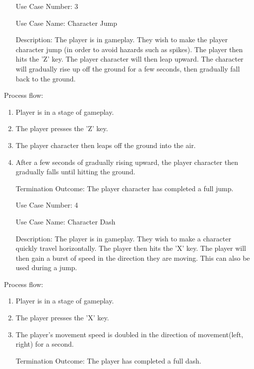 \documentclass[10pt,conference,onecolumn,compsoc]{IEEEtran}
\begin{document}
\begin{itemize}
\item[Use Case Number:] 3
\item[Use Case Name:] Character Jump
\item[Description:] The player is in gameplay. They wish to make the player character jump (in order to avoid hazards such as spikes). The player then hits the 'Z' key. The player character will then leap upward. The character will gradually rise up off the ground for a few seconds, then gradually fall back to the ground.
\end{itemize}

Process flow:

\begin{enumerate}
\item Player is in a stage of gameplay.
\item The player presses the 'Z' key.
\item The player character then leaps off the ground into the air.
\item After a few seconds of gradually rising upward, the player character then gradually falls until hitting the ground.
\item[Termination Outcome:] The player character has completed a full jump.
\end{enumerate}

\begin{itemize}
\item[Use Case Number:] 4
\item[Use Case Name:] Character Dash
\item[Description:] The player is in gameplay. They wish to make a character quickly travel horizontally. The player then hits the 'X' key. The player will then gain a burst of speed in the direction they are moving. This can also be used during a jump.
\end{itemize}

Process flow:

\begin{enumerate}
\item Player is in a stage of gameplay.
\item The player presses the 'X' key.
\item The player's movement speed is doubled in the direction of movement(left, right) for a second.
\item[Termination Outcome:] The player has completed a full dash.
\end{enumerate}
\end{document}

